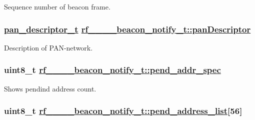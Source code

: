 Sequence number of beacon frame. \hypertarget{structrf__802__15__4__beacon__notify__t_95757d52f8c93f6b606bb18011c5c9ac}{
\subsubsection[panDescriptor]{\setlength{\rightskip}{0pt plus 5cm}\hyperlink{structpan__descriptor__t}{pan\_\-descriptor\_\-t} \hyperlink{structrf__802__15__4__beacon__notify__t_95757d52f8c93f6b606bb18011c5c9ac}{rf\_\_\_\_\-beacon\_\-notify\_\-t::pan\-Descriptor}}}
\label{structrf__802__15__4__beacon__notify__t_95757d52f8c93f6b606bb18011c5c9ac}


Description of PAN-network. \hypertarget{structrf__802__15__4__beacon__notify__t_65ed3ca74f853fa41c161844d901d87d}{
\subsubsection[pend\_\-addr\_\-spec]{\setlength{\rightskip}{0pt plus 5cm}uint8\_\-t \hyperlink{structrf__802__15__4__beacon__notify__t_65ed3ca74f853fa41c161844d901d87d}{rf\_\_\_\_\-beacon\_\-notify\_\-t::pend\_\-addr\_\-spec}}}
\label{structrf__802__15__4__beacon__notify__t_65ed3ca74f853fa41c161844d901d87d}


Shows pendind address count. \hypertarget{structrf__802__15__4__beacon__notify__t_a8b0e217a6210483b05eeb7d631be1fd}{
\subsubsection[pend\_\-address\_\-list]{\setlength{\rightskip}{0pt plus 5cm}uint8\_\-t \hyperlink{structrf__802__15__4__beacon__notify__t_a8b0e217a6210483b05eeb7d631be1fd}{rf\_\_\_\_\-beacon\_\-notify\_\-t::pend\_\-address\_\-list}\mbox{[}56\mbox{]}}}
\label{structrf__802__15__4__beacon__notify__t_a8b0e217a6210483b05eeb7d631be1fd}



